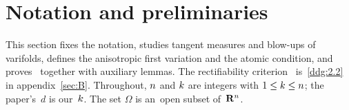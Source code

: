 \documentclass[a4paper,twoside,leqno]{article}
\begin{document}
\section{Notation and preliminaries}
\label{sec:prelim}

\begin{miniremark}
    \label{mr:prelim}
    This section fixes the notation, studies tangent measures and blow-ups of varifolds, defines
    the anisotropic first variation and the atomic condition, and proves~\cite[Lemmas~2.1, 2.3
    and~2.4]{DePhilippis2018} together with auxiliary lemmas. The rectifiability
    criterion~\cite[Lemma~2.2]{DePhilippis2018} is~\ref{ddg:2.2} in appendix~\ref{sec:B}. Throughout, $n$ and
    $k$ are integers with $1 \le k \le n$; the paper's~$d$ is our~$k$. The set
    $\Omega$ is an~open subset of~$\mathbf{R}^{n}$.
\end{miniremark}
\end{document}
